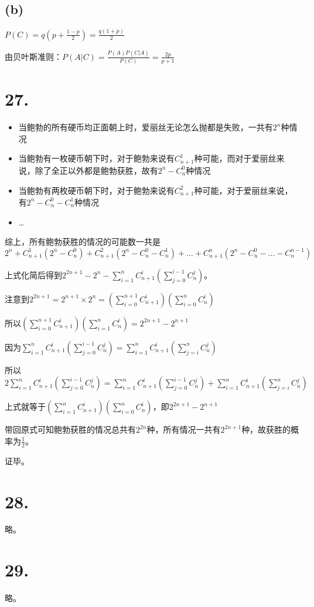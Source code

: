 \documentclass[UTF8]{article}
\begin{document}
        \subsection*{(b)}
            $P(C) = q(p + \frac{1 - p}{2}) = \frac{q(1 + p)}{2}$

            由贝叶斯准则：$P(A|C) = \frac{P(A)P(C|A)}{P(C)} = \frac{2p}{p + 1}$
    \section*{27.}
        \begin{itemize}
            \item 当鲍勃的所有硬币均正面朝上时，爱丽丝无论怎么抛都是失败，一共有$2^n$种情况
            \item 当鲍勃有一枚硬币朝下时，对于鲍勃来说有$C^1_{n+1}$种可能，而对于爱丽丝来说，除了全正以外都是鲍勃获胜，故有$2^n - C^0_n$种情况
            \item 当鲍勃有两枚硬币朝下时，对于鲍勃来说有$C^2_{n+1}$种可能，对于爱丽丝来说，有$2^n - C^0_n - C^1_n$种情况
            \item \dots
        \end{itemize}
        综上，所有鲍勃获胜的情况的可能数一共是
        $2^n + C_{n + 1}^1(2^n - C_n^0) + C_{n + 1}^2(2^n - C_n^0 - C_n^1) + \dots + C_{n + 1}^n(2^n - C_n^0 - \dots - C_n^{n - 1})$

        上式化简后得到$2^{2n + 1} - 2^n - \sum_{i = 1}^nC_{n + 1}^i(\sum_{j = 0}^{i - 1}C_n^j)$。

        注意到$2^{2n + 1} = 2^{n + 1} \times 2^n = (\sum_{i = 0}^{n + 1}C_{n + 1}^i)(\sum_{i = 0}^{n}C_n^i)$

        所以$(\sum_{i = 0}^{n + 1}C_{n + 1}^i)(\sum_{i = 1}^{n}C_n^i) = 2^{2n + 1} - 2^{n + 1}$

        因为$\sum_{i = 1}^{n}C_{n + 1}^i(\sum_{j = 0}^{i - 1}C_n^j) = \sum_{i = 1}^{n}C_{n + 1}^i(\sum_{j = i}^{n}C_n^j)$

        所以
        $2\sum_{i = 1}^{n}C_{n + 1}^i(\sum_{j = 0}^{i - 1}C_n^j) = \sum_{i = 1}^{n}C_{n + 1}^i(\sum_{j = 0}^{i - 1}C_n^j) + \sum_{i = 1}^{n}C_{n + 1}^i(\sum_{j = i}^{n}C_n^j)$

        上式就等于$(\sum_{i = 1}^{n}C_{n + 1}^i)(\sum_{i = 0}^{n}C_n^i)$，即$2^{2n + 1} - 2^{n + 1}$

        带回原式可知鲍勃获胜的情况总共有$2^{2n}$种，所有情况一共有$2^{2n + 1}$种，故获胜的概率为$\frac{1}{2}$。

        证毕。
    \section*{28.}
        略。
    \section*{29.}
        略。
\end{document}
